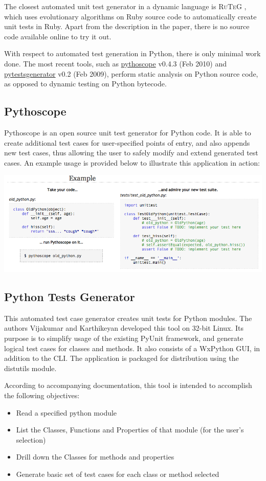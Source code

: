 \documentclass{icldt}
\numberwithin{equation}{section}       %
\begin{document}
The closest automated unit test generator in a dynamic language is \textsc{RuTeG} \cite{Mairhofer2011}, which uses evolutionary algorithms on Ruby source code to automatically create unit tests in Ruby. Apart from the description in the paper, there is no source code available online to try it out.

With respect to automated test generation in Python, there is only minimal work done. The most recent tools, such as \href{http://pythoscope.org/tutorial}{\textsf{pythoscope}} v0.4.3 (Feb 2010) and \href{http://code.google.com/p/pytestsgenerator}{\textsf{pytestsgenerator}} v0.2 (Feb 2009), perform static analysis on Python source code, as opposed to dynamic testing on Python bytecode.

\subsection{Pythoscope}
Pythoscope is an open source unit test generator for Python code. It is able to create additional test cases for user-specified points of entry, and also appends new test cases, thus allowing the user to safely modify and extend generated test cases. An example usage is provided below to illustrate this application in action:

\includegraphics[scale=.46]{pythoscope.png}

\subsection{Python Tests Generator}
This automated test case generator creates unit tests for Python modules. The authors Vijakumar and Karthikeyan developed this tool on 32-bit Linux. Its purpose is to simplify usage of the existing PyUnit framework, and generate logical test cases for classes and methods. It also consists of a WxPython GUI, in addition to the CLI. The application is packaged for distribution using the \textsf{distutils} module.

According to accompanying documentation, this tool is intended to accomplish the following objectives:
\begin{itemize}
	\item Read a specified python module
	\item List the Classes, Functions and Properties of that module (for the user's selection)
	\item Drill down the Classes for methods and properties
	\item Generate basic set of test cases for each class or method selected
\end{itemize}
\end{document}
